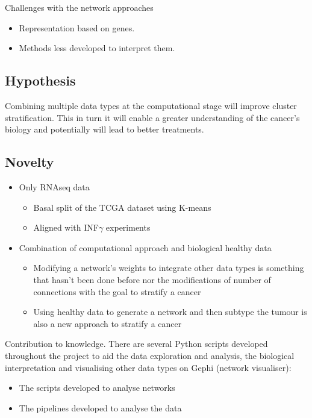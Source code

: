 Challenges with the network approaches
\begin{itemize}
    \item Representation based on genes.
    \item Methods less developed to interpret them. 
\end{itemize}

\subsection{Hypothesis} 

Combining multiple data types at the computational stage will improve cluster stratification. This in turn it will enable a greater understanding of the cancer's biology and potentially will lead to better treatments.


\subsection{Novelty} 


\begin{itemize}
    \item Only RNAseq data
    \begin{itemize}
        \item Basal split of the TCGA dataset using K-means 
        \item Aligned with INF$\gamma$ experiments
    \end{itemize}
    \item Combination of computational approach and biological healthy data
    \begin{itemize}
        \item Modifying a network's weights to integrate other data types is something that hasn’t been done before nor the modifications of number of connections with the goal to stratify a cancer 
        \item Using healthy data to generate a network and then subtype the tumour is also a new approach to stratify a cancer
    \end{itemize}
\end{itemize}


Contribution to knowledge. There are several Python scripts developed throughout the project to aid the data exploration and analysis, the biological interpretation and visualising other data types on Gephi (network visualiser):
\begin{itemize}
    \item The scripts developed to analyse networks
    \item The pipelines developed to analyse the data
\end{itemize}


